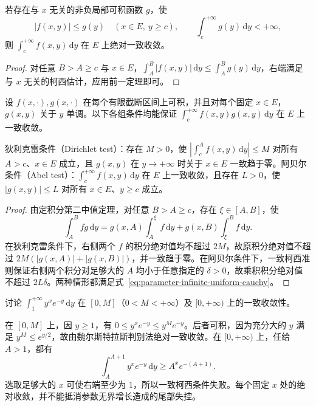\begin{theorem}[魏尔斯特拉斯判别法]
\label{thm:parameter-infinite-weierstrass}
若存在与 $x$ 无关的非负局部可积函数 $g$，使
\[
    |f(x,y)|\leq g(y)\quad(x\in E,\ y\geq c),\qquad
    \int_c^{+\infty}g(y)\,\mathrm{d}y<+\infty,
\]
则 $\int_c^{+\infty}f(x,y)\,\mathrm{d}y$ 在 $E$ 上绝对一致收敛。
\end{theorem}

\begin{proof}
对任意 $B>A\geq c$ 与 $x\in E$，$\int_A^B|f(x,y)|\,\mathrm{d}y\leq\int_A^B g(y)\,\mathrm{d}y$，右端满足与 $x$ 无关的柯西估计，应用前一定理即可。
\end{proof}

\begin{theorem}[狄利克雷与阿贝尔判别法]
\label{thm:parameter-infinite-dirichlet-abel}
设 $f(x,\cdot),g(x,\cdot)$ 在每个有限截断区间上可积，并且对每个固定 $x\in E$，$g(x,y)$ 关于 $y$ 单调。以下各组条件均能保证 $\int_c^{+\infty}f(x,y)g(x,y)\,\mathrm{d}y$ 在 $E$ 上一致收敛。

狄利克雷条件（Dirichlet test）：存在 $M>0$，使 $|\int_c^A f(x,y)\,\mathrm{d}y|\leq M$ 对所有 $A>c$、$x\in E$ 成立，且 $g(x,y)$ 在 $y\to+\infty$ 时关于 $x\in E$ 一致趋于零。阿贝尔条件（Abel test）：$\int_c^{+\infty}f(x,y)\,\mathrm{d}y$ 在 $E$ 上一致收敛，且存在 $L>0$，使 $|g(x,y)|\leq L$ 对所有 $x\in E$、$y\geq c$ 成立。
\end{theorem}

\begin{proof}
由定积分第二中值定理，对任意 $B>A\geq c$，存在 $\xi\in[A,B]$，使
\[
    \int_A^B fg\,\mathrm{d}y
    =g(x,A)\int_A^\xi f\,\mathrm{d}y
      +g(x,B)\int_\xi^B f\,\mathrm{d}y.
\]
在狄利克雷条件下，右侧两个 $f$ 的积分绝对值均不超过 $2M$，故原积分绝对值不超过 $2M(|g(x,A)|+|g(x,B)|)$，并一致趋于零。在阿贝尔条件下，一致柯西准则保证右侧两个积分对足够大的 $A$ 均小于任意指定的 $\delta>0$，故乘积积分绝对值不超过 $2L\delta$。两种情形都满足式~\eqref{eq:parameter-infinite-uniform-cauchy}。
\end{proof}

\begin{example}
\label{ex:parameter-exponential-tail-domain}
讨论 $\displaystyle\int_1^{+\infty}y^x e^{-y}\,\mathrm{d}y$ 在 $[0,M]$（$0<M<+\infty$）及 $[0,+\infty)$ 上的一致收敛性。
\end{example}

\begin{solve}
在 $[0,M]$ 上，因 $y\geq1$，有 $0\leq y^x e^{-y}\leq y^M e^{-y}$。后者可积，因为充分大的 $y$ 满足 $y^M\leq e^{y/2}$，故由魏尔斯特拉斯判别法绝对一致收敛。在 $[0,+\infty)$ 上，任给 $A>1$，都有
\[
    \int_A^{A+1}y^x e^{-y}\,\mathrm{d}y
    \geq A^x e^{-(A+1)}.
\]
选取足够大的 $x$ 可使右端至少为 $1$，所以一致柯西条件失败。每个固定 $x$ 处的绝对收敛，并不能抵消参数无界增长造成的尾部失控。
\end{solve}

